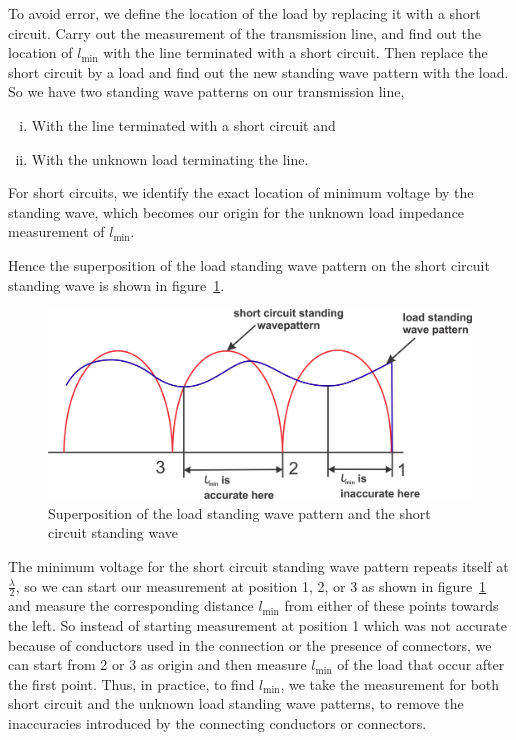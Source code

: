 To avoid error, we define the location of the load by replacing it with a short circuit. Carry out the measurement of the transmission line, and find out the location of $l_\min$ with the line terminated with a short circuit. Then replace the short circuit by a load and find out the new standing wave pattern with the load. So we have two standing wave patterns on our transmission line,
\begin{enumerate}[(i)]
\item With the line terminated with a short circuit and 
\item With the unknown load terminating the line.
\end{enumerate}
For short circuits, we identify the exact location of minimum voltage by the standing wave, which becomes our origin for the unknown load impedance measurement of $l_\min$.

Hence the superposition of the load standing wave pattern on the short circuit standing wave is shown in figure~\ref{fig:group10diagram2}.
\begin{figure}[h]
\centering
\includegraphics[width=1\linewidth]{./graphics/group10diagram2}
\caption{Superposition of the load standing wave pattern and the short circuit standing wave}
\label{fig:group10diagram2}
\end{figure}

The minimum voltage for the short circuit standing wave pattern repeats itself at $\frac{\lambda}{2}$, so we can start our measurement at position 1, 2, or 3 as shown in figure~\ref{fig:group10diagram2} and measure the corresponding distance $l_\min$ from either of these points towards the left. So instead of starting measurement at position 1 which was not accurate because of conductors used in the connection or the presence of connectors, we can start from 2 or 3 as origin and  then measure $l_\min$ of the load that occur after the first point. Thus, in practice, to find $l_\min$, we take the measurement for both short circuit and the unknown load standing wave patterns, to remove the inaccuracies introduced by the connecting conductors or connectors.

